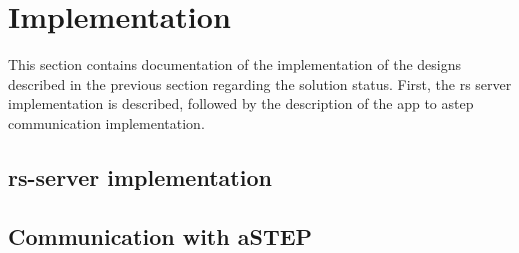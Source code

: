 \section{Implementation}
This section contains documentation of the implementation of the designs described in the previous section regarding the solution status.
First, the \gls{rs} server implementation is described, followed by the description of the app to \gls{astep} communication implementation.

\subsection{\gls{rs}-server implementation}


\subsection{Communication with aSTEP}

